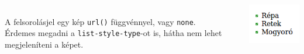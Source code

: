 %
\begin{frame}
  \begin{columns}[c]
      \begin{description}[m]
        \item[\texttt{list-style-image}] \hfill \\ A felsorolásjel egy kép \texttt{url()} függvénnyel, vagy \texttt{none}.\\
        Érdemes megadni a \texttt{list-style-type}-ot is, hátha nem lehet megjeleníteni a képet.
      \end{description}
      \vfill
      \begin{exampleblock}{}
        \scriptsize
        
      \end{exampleblock}
      \includegraphics[width=\textwidth]{sajatjelolo.png}
  \end{columns} 
\end{frame}


